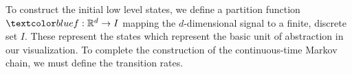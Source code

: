


To construct the initial low level states, we define a partition function $\lstopar{f}: \mathbb{R}^d \rightarrow I$ mapping the $d$-dimensional signal to a finite, discrete set $I$. These represent the states which represent the basic unit of abstraction in our visualization. To complete the construction of the continuous-time Markov chain, we must define the transition rates.



